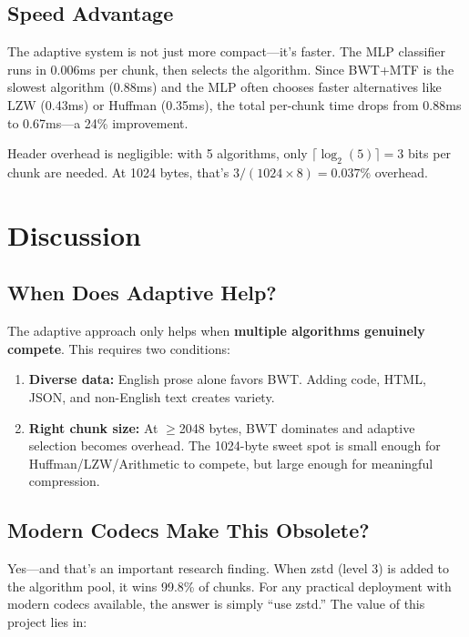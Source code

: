 \documentclass[12pt,a4paper]{article}
\begin{document}
\subsection{Speed Advantage}

The adaptive system is not just more compact---it's faster. The MLP classifier runs in 0.006ms per chunk, then selects the algorithm. Since BWT+MTF is the slowest algorithm (0.88ms) and the MLP often chooses faster alternatives like LZW (0.43ms) or Huffman (0.35ms), the total per-chunk time drops from 0.88ms to 0.67ms---a 24\% improvement.

Header overhead is negligible: with 5 algorithms, only $\lceil\log_2(5)\rceil = 3$ bits per chunk are needed. At 1024 bytes, that's $3/(1024\times8) = 0.037\%$ overhead.

\section{Discussion}

\subsection{When Does Adaptive Help?}

The adaptive approach only helps when \textbf{multiple algorithms genuinely compete}. This requires two conditions:

\begin{enumerate}[nosep]
    \item \textbf{Diverse data:} English prose alone favors BWT. Adding code, HTML, JSON, and non-English text creates variety.
    \item \textbf{Right chunk size:} At $\geq$2048 bytes, BWT dominates and adaptive selection becomes overhead. The 1024-byte sweet spot is small enough for Huffman/LZW/Arithmetic to compete, but large enough for meaningful compression.
\end{enumerate}

\subsection{Modern Codecs Make This Obsolete?}

Yes---and that's an important research finding. When zstd (level 3) is added to the algorithm pool, it wins 99.8\% of chunks. For any practical deployment with modern codecs available, the answer is simply ``use zstd.'' The value of this project lies in:
\end{document}
